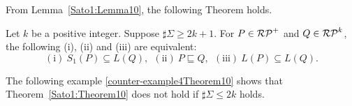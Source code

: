 From Lemma~\ref{Sato1:Lemma10}, the following Theorem holds.
\begin{thm}\label{Sato1:Theorem10}%
    Let $k$ be a positive integer. Suppose $\sharp\Sigma \geq 2k+1$.
    For $P \in \mathcal{RP}^{+}$ and $Q \in \mathcal{RP}^{k}$, 
    the following (i), (ii) and (iii) are equivalent:
    \[
        (\mathrm{i})\ S_{1}(P) \subseteq L(Q),\ \
        (\mathrm{ii})\ P \sqsubseteq Q,\ \
        (\mathrm{iii})\ L(P) \subseteq L(Q).
    \]
\end{thm}
%

The following example \ref{counter-example4Theorem10} shows  that Theorem~\ref{Sato1:Theorem10} does not hold 
if $\sharp\Sigma\leq 2k$ holds.
